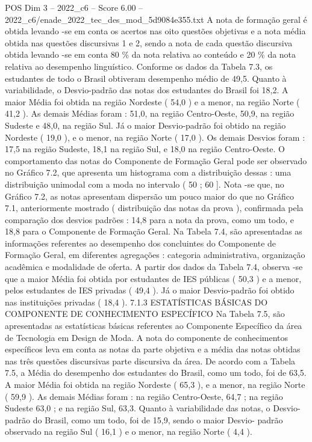 \begin{textsample}{POS Dim 3 – 2022\_c6 – Score 6.00 – 2022\_c6/enade\_2022\_tec\_des\_mod\_5d9084e355.txt}
A nota de formação geral é obtida levando -se em conta os acertos nas oito questões objetivas e a nota média obtida nas questões discursivas 1 e 2, sendo a nota de cada questão discursiva obtida levando -se em conta 80 \% da nota relativa ao conteúdo e 20 \% da nota relativa ao desempenho linguístico.
Conforme os dados da Tabela 7.3, os estudantes de todo o Brasil obtiveram desempenho médio de 49,5.
Quanto à variabilidade, o Desvio-padrão das notas dos estudantes do Brasil foi 18,2.
A maior Média foi obtida na região Nordeste ( 54,0 ) e a menor, na região Norte ( 41,2 ).
As demais Médias foram : 51,0, na região Centro-Oeste, 50,9, na região Sudeste e 48,0, na região Sul.
Já o maior Desvio-padrão foi obtido na região Nordeste ( 19,0 ), e o menor, na região Norte ( 17,0 ).
Os demais Desvios foram : 17,5 na região Sudeste, 18,1 na região Sul, e 18,0 na região Centro-Oeste.
O comportamento das notas do Componente de Formação Geral pode ser observado no Gráfico 7.2, que apresenta um histograma com a distribuição dessas : uma distribuição unimodal com a moda no intervalo ( 50 ; 60 ].
Nota -se que, no Gráfico 7.2, as notas apresentam dispersão um pouco maior do que no Gráfico 7.1, anteriormente mostrado ( distribuição das notas da prova ), confirmada pela comparação dos desvios padrões : 14,8 para a nota da prova, como um todo, e 18,8 para o Componente de Formação Geral.
Na Tabela 7.4, são apresentadas as informações referentes ao desempenho dos concluintes do Componente de Formação Geral, em diferentes agregações : categoria administrativa, organização acadêmica e modalidade de oferta.
A partir dos dados da Tabela 7.4, observa -se que a maior Média foi obtida por estudantes de IES públicas ( 50,3 ) e a menor, pelos estudantes de IES privadas ( 49,4 ).
Já o maior Desvio-padrão foi obtido nas instituições privadas ( 18,4 ). 7.1.3 ESTATÍSTICAS BÁSICAS DO COMPONENTE DE CONHECIMENTO ESPECÍFICO Na Tabela 7.5, são apresentadas as estatísticas básicas referentes ao Componente Específico da área de Tecnologia em Design de Moda.
A nota do componente de conhecimentos específicos leva em conta as notas da parte objetiva e a média das notas obtidas nas três questões discursivas parte discursiva da área.
De acordo com a Tabela 7.5, a Média do desempenho dos estudantes do Brasil, como um todo, foi de 63,5.
A maior Média foi obtida na região Nordeste ( 65,3 ), e a menor, na região Norte ( 59,9 ).
As demais Médias foram : na região Centro-Oeste, 64,7 ; na região Sudeste 63,0 ; e na região Sul, 63,3.
Quanto à variabilidade das notas, o Desvio-padrão do Brasil, como um todo, foi de 15,9, sendo o maior Desvio- padrão observado na região Sul ( 16,1 ) e o menor, na região Norte ( 4,4 ).

\end{textsample}
